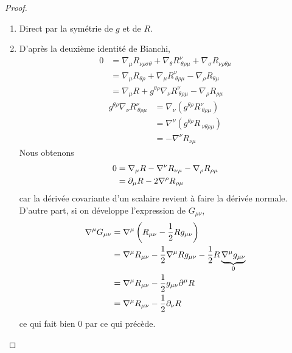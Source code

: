 \documentclass[a4paper,11pt]{report}
\begin{document}
        \begin{proof}${}$
            \begin{enumerate}[label = \textit{\roman*)}]
                \item Direct par la symétrie de $g$ et de $R$.
                \item D'après la deuxième identité de Bianchi, 
                \begin{align}
                    0& =\nabla_\mu R_{\nu\rho\sigma\theta} + \nabla_\theta R^\nu_{~\theta\rho\mu}+\nabla_\sigma R_{\nu\rho\theta\mu} \\
                    &= \nabla_\mu R_{\theta\rho}+\nabla_\mu R^\nu_{~\theta\rho\mu} - \nabla_\rho R_{\theta\mu} \\
                    &= \nabla_\mu R + g^{\theta\rho} \nabla_\nu R^\nu_{~\theta\rho\mu} - \nabla_\rho R_{\rho\mu} 
                \end{align}
                \begin{align}
                    g^{\theta\rho} \nabla_\nu R^\nu_{~\theta\rho\mu} &= \nabla_\nu (g^{\theta\rho}R^\nu_{~\theta\rho\mu}) \\
                    &= \nabla^\nu (g^{\theta\rho}R_{~\nu\theta\rho\mu})\\
                    &= -\nabla^\nu R_{\nu\mu}
                \end{align}
                Nous obtenons 
                \begin{align}
                    0 &= \nabla_\mu R -\nabla^\nu R_{\nu\mu} - \nabla_\rho R_{\rho\mu}\\
                    &= \partial_\mu R -2\nabla^\rho R_{\rho\mu}
                \end{align}
                car la dérivée covariante d'un scalaire revient à faire la dérivée normale. D'autre part, si on développe l'expression de $G_{\mu\nu}$,
                \begin{align}
                    \nabla^\mu G_{\mu\nu} &= \nabla^\mu \left(R_{\mu\nu}-\frac{1}{2}Rg_{\mu\nu}\right)\\
                    &= \nabla^\mu R_{\mu\nu}-\frac{1}{2}\nabla^\mu Rg_{\mu\nu}-\frac{1}{2}R \underbrace{\nabla^\mu g_{\mu\nu}}_{0}\\
                    &= \nabla^\mu R_{\mu\nu} -\frac{1}{2}g_{\mu\nu}\partial^\mu R \\
                    &= \nabla^\mu R_{\mu\nu} -\frac{1}{2}\partial_\nu R 
                \end{align}
                ce qui fait bien $0$ par ce qui précède.
            \end{enumerate}
        \end{proof}
        
\end{document}
